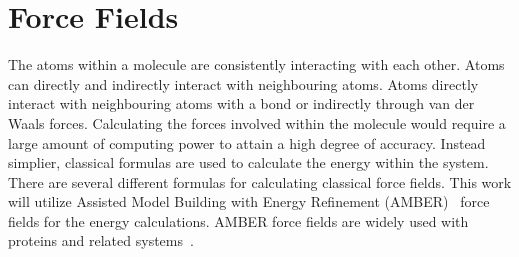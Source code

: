 \section{Force Fields}

The atoms within a molecule are consistently interacting with each other. Atoms can directly and indirectly interact with neighbouring atoms. Atoms directly interact with neighbouring atoms with a bond or indirectly through van der Waals forces. Calculating the forces involved within the molecule would require a large amount of computing power to attain a high degree of accuracy. Instead simplier, classical formulas are used to calculate the energy within the system. There are several different formulas for calculating classical force fields. This work will utilize Assisted Model Building with Energy Refinement (AMBER)~\cite{cornell1995second} force fields for the energy calculations. AMBER force fields are widely used with proteins and related systems~\cite{ponder2003force}.


